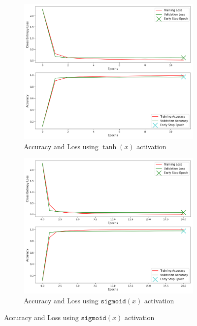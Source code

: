 \begin{figure}[H]
	\begin{subfigure}{0.5\textwidth}
		\centering
		\includegraphics[width=1.0\textwidth]{./images/activation_tanh.png}
		\caption{Accuracy and Loss using $\tanh(x)$ activation}
		\label{fig:tanh}
	\end{subfigure}
	\begin{subfigure}{0.5\textwidth}
		\centering
		\includegraphics[width=1.0\textwidth]{./images/activation_sigmoid.png}
		\caption{Accuracy and Loss using $\texttt{sigmoid}(x)$ activation}
		\label{fig:sigmoid}
	\end{subfigure}
\end{figure}
